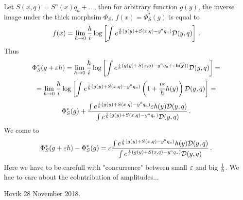 Let
   $S(x,q)=S^a(x)q_a+\dots$, then for arbitrary function $g(y)$, the
inverse image under the thick morphsim $\Phi_S$, 
$f(x)=\Phi_S^*(g)$ is equal to
            $$
f(x)=\lim_{\hbar\to 0}
                    {\hbar\over i}
                     \log
                   \left[
                     \int
                      e^
                          {
                      {i\over \hbar}
                       \left(
             g(y)+S(x,q)-y^aq_a
                          \right)
                         }
                     {\cal D}(y,q)
                      \right]\,.
            $$
Thus
                $$
\Phi_S^*(g+{\varepsilon} h)=\lim_{\hbar\to 0}
                    {\hbar\over i}
                     \log
                   \left[
                     \int
                      e^
                          {
                      {i\over \hbar}
                       \left(
             g(y)+S(x,q)-y^aq_a+{\bf {\varepsilon} h(y)}
                          \right)
                         }
                     {\cal D}(y,q)
                      \right]=
                $$
           $$
=\lim_{\hbar\to 0}
                    {\hbar\over i}
                     \log
                   \left[
                     \int
                      e^
                          {
                      {i\over \hbar}
                       \left(
             g(y)+S(x,q)-y^aq_a
                          \right)
                         }
                  \left(1+{i{\varepsilon}\over \hbar} h(y)\right)
                     {\cal D}(y,q)
                      \right]=
                $$
            $$
\Phi_S^*(g)+
                         {
                      \int
                      e^
                          {
                      {i\over \hbar}
                       \left(
             g(y)+S(x,q)-y^aq_a
                          \right)
                         }
                  {\varepsilon} h(y)
                     {\cal D}(y,q)
\over
                     \int
                      e^
                          {
                      {i\over \hbar}
                       \left(
             g(y)+S(x,q)-y^aq_a
                          \right)
                         }
                     {\cal D}(y,q)
             }\,.
            $$
        We come to
        $$
\Phi_S^*(g+{\varepsilon} h)
 -
\Phi_S^*(g)
=                {\varepsilon}
                    {
                    \int
                     e^
                     {
                 {i\over \hbar}
                    \left(
             g(y)+S(x,q)-y^aq_a
                          \right)
                         }
                  h(y)
                     {\cal D}(y,q)
\over
                     \int
                      e^
                          {
                      {i\over \hbar}
                       \left(
             g(y)+S(x,q)-y^aq_a
                          \right)
                         }
                     {\cal D}(y,q)
             }\,.
       $$
Here  we have to be carefull with "concurrence"
between small ${\varepsilon}$ and big $1\over \hbar$.
We hae to care about the cobntribution of amplitudes...

Hovik   28 November 2018.


\bye
